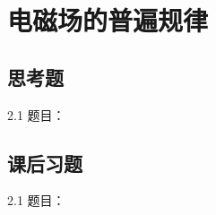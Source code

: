 \chapter{电磁场的普遍规律}

\section{思考题}

\begin{thinking}{2.1}
  题目：\todoanswer

  \begin{solution}
    \todoanswer
  \end{solution}
\end{thinking}

\section{课后习题}

\begin{exercise}{2.1}
  题目：\todoanswer

  \begin{solution}
    \todoanswer
  \end{solution}
\end{exercise}
